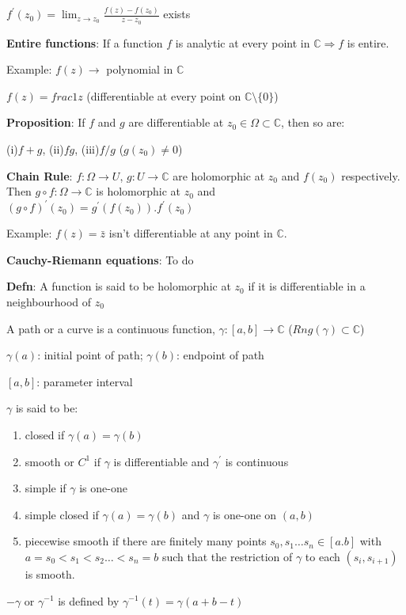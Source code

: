 \documentclass{article}
\begin{document}
\begin{flushleft}
$f^{'}(z_0)= \lim_{z \to z_0} \frac{f(z)-f(z_0)}{z-z_0}$ exists 

\textbf{Entire functions}: If a function $f$ is analytic at every point in $\mathds{C}\Rightarrow f$ is entire.

Example: $f(z)\rightarrow$ polynomial in $\mathds{C}$ 

$f(z)=frac{1}{z}$ (differentiable at every point on $\mathds{C}\setminus \{0\}$)

\textbf{Proposition}: If $f$ and $g$ are differentiable at $z_0\in \Omega \subset \mathds{C}$, then so are:

(i)$f+g$, (ii)$fg$, (iii)$f/g$ ($g(z_0)\neq 0$)

\textbf{Chain Rule}: $f:\Omega \rightarrow U$, $g:U\rightarrow \mathds{C}$ are holomorphic at $z_0$ and $f(z_0)$ respectively.
Then $g\circ f:\Omega\rightarrow \mathds{C}$ is holomorphic at $z_0$ and $(g\circ f)^{'}(z_0)=g^{'}(f(z_0)).f^{'}(z_0)$

Example: $f(z)=\bar{z}$ isn't differentiable at any point in $\mathds{C}$.

\textbf{Cauchy-Riemann equations}: To do 

\textbf{Defn}: A function is said to be holomorphic at $z_0$ if it is differentiable in a neighbourhood of $z_0$

A path or a curve is a continuous function, $\gamma:[a,b]\rightarrow \mathds{C}$ 
($Rng(\gamma)\subset \mathds{C}$) 

$\gamma(a)$: initial point of path; $\gamma(b)$: endpoint of path

$[a,b]$: parameter interval 

$\gamma$ is said to be:
\begin{enumerate}
    \item closed if $\gamma(a)=\gamma(b)$
    \item smooth or $C^1$ if $\gamma$ is differentiable and $\gamma^{'}$ is continuous
    \item simple if $\gamma$ is one-one
    \item simple closed if $\gamma(a)=\gamma(b)$ and $\gamma$ is one-one on $(a,b)$
    \item piecewise smooth if there are finitely many points $s_0,s_1 \dots s_n\in [a.b]$ with $a=s_0<s_1<s_2 \dots <s_n=b$ such that the restriction of $\gamma$ to each $(s_i,s_{i+1})$ is smooth.

\end{enumerate}

$-\gamma$ or $\gamma^{-1}$ is defined by $\gamma^{-1}(t)=\gamma(a+b-t)$


\end{flushleft}
\end{document}
